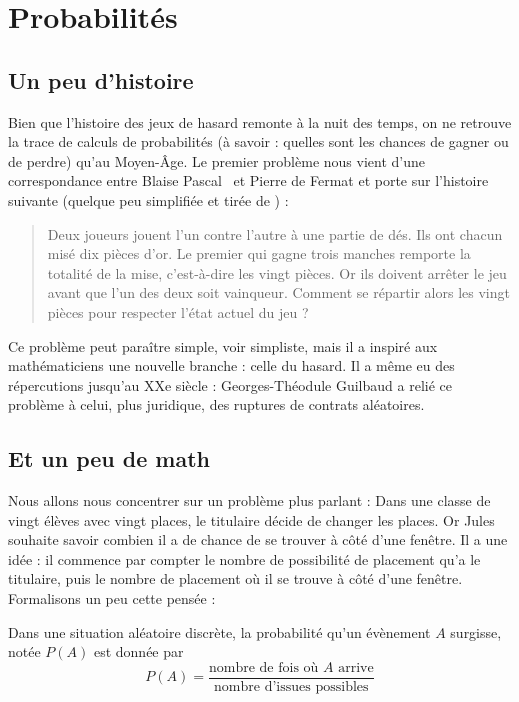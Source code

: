 \chapter{Probabilités}

\section{Un peu d'histoire}

Bien que l'histoire des jeux de hasard remonte à la nuit des temps, on ne retrouve la trace de calculs de probabilités (à savoir : quelles sont les chances de gagner ou de perdre) qu'au Moyen-Âge. Le premier problème nous vient d'une correspondance entre Blaise Pascal~ et Pierre de Fermat et porte sur l'histoire suivante (quelque peu simplifiée et tirée de \cite{godfroy2000pascal}) :
\begin{quote}
Deux joueurs jouent l'un contre l'autre à une partie de dés. Ils ont chacun misé dix pièces d'or. Le premier qui gagne trois manches remporte la totalité de la mise, c'est-à-dire les vingt pièces. Or ils doivent arrêter le jeu avant que l'un des deux soit vainqueur. Comment se répartir alors les vingt pièces pour respecter l'état actuel du jeu ?
\end{quote}

Ce problème peut paraître simple, voir simpliste, mais il a inspiré aux mathématiciens une nouvelle branche : celle du hasard. Il a même eu des répercutions jusqu'au XXe siècle\cite{coumet1970theorie} : Georges-Théodule Guilbaud a relié ce problème à celui, plus juridique, des ruptures de contrats aléatoires.

\section{Et un peu de math}

Nous allons nous concentrer sur un problème plus parlant : Dans une classe de vingt élèves avec vingt places, le titulaire décide de changer les places. Or Jules souhaite savoir combien il a de chance de se trouver à côté d'une fenêtre. Il a une idée : il commence par compter le nombre de possibilité de placement qu'a le titulaire, puis le nombre de placement où il se trouve à côté d'une fenêtre. Formalisons un peu cette pensée :

\begin{definition}
Dans une situation aléatoire discrète, la probabilité qu'un évènement $A$ surgisse, notée $P(A)$ est donnée par
$$
P(A) = \frac{\mbox{nombre de fois où }A\mbox{ arrive}}{\mbox{nombre d'issues possibles}}
$$
\end{definition}


